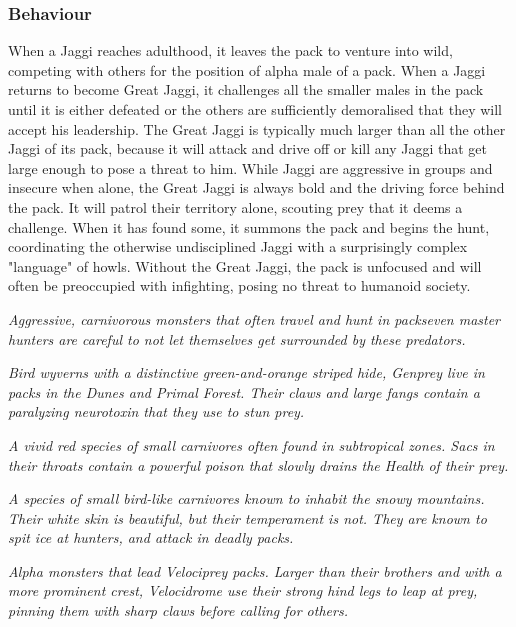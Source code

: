\subsubsection{Behaviour}
When a Jaggi reaches adulthood, it leaves the pack to venture into wild, competing with others for the position of alpha male of a pack. When a Jaggi returns to become Great Jaggi, it challenges all the smaller males in the pack until it is either defeated or the others are sufficiently demoralised that they will accept his leadership. The Great Jaggi is typically much larger than all the other Jaggi of its pack, because it will attack and drive off or kill any Jaggi that get large enough to pose a threat to him. While Jaggi are aggressive in groups and insecure when alone, the Great Jaggi is always bold and the driving force behind the pack. It will patrol their territory alone, scouting prey that it deems a challenge. When it has found some, it summons the pack and begins the hunt, coordinating the otherwise undisciplined Jaggi with a surprisingly complex "language" of howls. Without the Great Jaggi, the pack is unfocused and will often be preoccupied with infighting, posing no threat to humanoid society.

\textit{Aggressive, carnivorous monsters that often travel and hunt in packs\hbNone even master hunters are careful to not let themselves get surrounded by these predators.}

\textit{Bird wyverns with a distinctive green-and-orange striped hide, Genprey live in packs in the Dunes and Primal Forest. Their claws and large fangs contain a paralyzing neurotoxin that they use to stun prey.}

\textit{A vivid red species of small carnivores often found in subtropical zones. Sacs in their throats contain a powerful poison that slowly drains the Health of their prey.}

\textit{A species of small bird-like carnivores known to inhabit the snowy mountains. Their white skin is beautiful, but their temperament is not. They are known to spit ice at hunters, and attack in deadly packs.}

\textit{Alpha monsters that lead Velociprey packs. Larger than their brothers and with a more prominent crest, Velocidrome use their strong hind legs to leap at prey, pinning them with sharp claws before calling for others.}%

